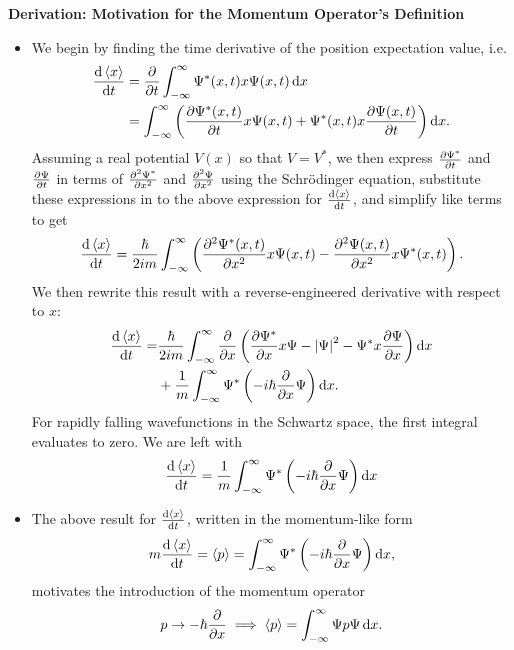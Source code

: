 \documentclass[11pt, a4paper]{article}
\newcommand{\diff}{\mathop{}\!\mathrm{d}} %
\newcommand{\Schro}{Schr\"{o}dinger\xspace}
\renewcommand{\P}{\Psi}  %
\begin{document}
\textbf{Derivation: Motivation for the Momentum Operator's Definition}
\begin{itemize}
	\item We begin by finding the time derivative of the position expectation value, i.e.
	\begin{align*}
		\dv{\ev{x}}{t} &= \pdv{t}\int_{-\infty}^{\infty} \Psi^{*}(x, t)x\Psi(x,t)\diff x \\
		&= \int_{-\infty}^{\infty} \left(\pdv{\P^{*}(x, t)}{t} x \P(x, t) + \P^{*}(x, t)x\pdv{\P(x, t)}{t}\right)\diff x.
	\end{align*}
    Assuming a real potential $ V(x) $ so that $ V = V^{*} $, we then express $ \pdv{\P^{*}}{t} $ and $ \pdv{\P}{t} $ in terms of $ \pdv[2]{\P^{*}}{x} $ and $ \pdv[2]{\P}{x} $ using the \Schro equation, substitute these expressions in to the above expression for $ \dv{\ev{x}}{t} $, and simplify like terms to get
	\begin{equation*}
		\dv{\ev{x}}{t} = \frac{\hbar}{2im}\int_{-\infty}^{\infty} \left( \pdv[2]{\P^{*}(x, t)}{x} x \P(x, t) - \pdv[2]{\P(x, t)}{x} x \P^{*}(x, t) \right).
	\end{equation*}
	We then rewrite this result with a reverse-engineered derivative with respect to $ x $:
	\begin{align*}
		\dv{\ev{x}}{t} = & \frac{\hbar}{2im} \int_{-\infty}^{\infty} \pdv{x}\left(\pdv{\P^{*}}{x}x\P - \abs{\P}^{2} - \P^{*}x\pdv{\P}{x}\right)\diff x\\
		& + \frac{1}{m} \int_{-\infty}^{\infty} \P^{*} \left(-i\hbar \pdv{x}\P\right)\diff x.
	\end{align*}
	For rapidly falling wavefunctions in the Schwartz space, the first integral evaluates to zero. We are left with
	\begin{equation*}
		\dv{\ev{x}}{t} = \frac{1}{m} \int_{-\infty}^{\infty} \P^{*} \left(-i\hbar \pdv{x}\P\right)\diff x
	\end{equation*}
	
	\item The above result for $ \dv{\ev{x}}{t} $, written in the momentum-like form
	\begin{equation*}
		m \dv{\ev{x}}{t} = \ev{p} = \int_{-\infty}^{\infty} \P^{*} \left(-i\hbar \pdv{x}\P\right)\diff x,
	\end{equation*}
	motivates the introduction of the momentum operator
	\begin{equation*}
		p \to - \hbar \pdv{x} \implies \ev{p} = \int_{-\infty}^{\infty} \P p \P \diff x.
	\end{equation*}
\end{itemize}
\end{document}
